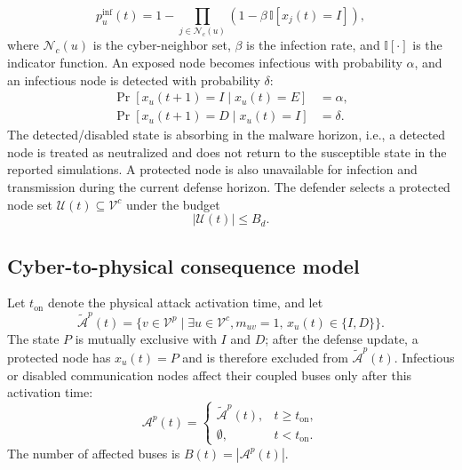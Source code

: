 \documentclass[lettersize,journal]{IEEEtran}
\begin{document}
\begin{equation}
    p_u^{\mathrm{inf}}(t)
    =
    1-
    \prod_{j\in\mathcal{N}_{c}(u)}
    \left(1-\beta\,\mathbb{I}[x_j(t)=I]\right),
    \label{eq:infection_prob}
\end{equation}
where $\mathcal{N}_{c}(u)$ is the cyber-neighbor set, $\beta$ is the infection rate, and $\mathbb{I}[\cdot]$ is the indicator function. An exposed node becomes infectious with probability $\alpha$, and an infectious node is detected with probability $\delta$:
\begin{equation}
\begin{aligned}
    \Pr[x_u(t+1)=I\mid x_u(t)=E]&=\alpha,\\
    \Pr[x_u(t+1)=D\mid x_u(t)=I]&=\delta .
\end{aligned}
    \label{eq:activation_detection}
\end{equation}
The detected/disabled state is absorbing in the malware horizon, i.e., a detected node is treated as neutralized and does not return to the susceptible state in the reported simulations. A protected node is also unavailable for infection and transmission during the current defense horizon. The defender selects a protected node set $\mathcal{U}(t)\subseteq\mathcal{V}^{c}$ under the budget
\begin{equation}
    |\mathcal{U}(t)|\leq B_d .
    \label{eq:defense_budget}
\end{equation}

\subsection{Cyber-to-physical consequence model}
\label{subsec:degradation_model}

Let $t_{\mathrm{on}}$ denote the physical attack activation time, and let
\[
\widetilde{\mathcal{A}}^{p}(t)=
\{v\in\mathcal{V}^{p}\mid \exists u\in\mathcal{V}^{c},
m_{uv}=1,\,x_u(t)\in\{I,D\}\}.
\]
The state $P$ is mutually exclusive with $I$ and $D$; after the defense update, a protected node has $x_u(t)=P$ and is therefore excluded from $\widetilde{\mathcal{A}}^{p}(t)$. Infectious or disabled communication nodes affect their coupled buses only after this activation time:
\begin{equation}
    \mathcal{A}^{p}(t)
    =
    \begin{cases}
    \widetilde{\mathcal{A}}^{p}(t), & t\geq t_{\mathrm{on}},\\
    \emptyset, & t<t_{\mathrm{on}} .
    \end{cases}
    \label{eq:affected_buses}
\end{equation}
The number of affected buses is $B(t)=|\mathcal{A}^{p}(t)|$.
\end{document}
